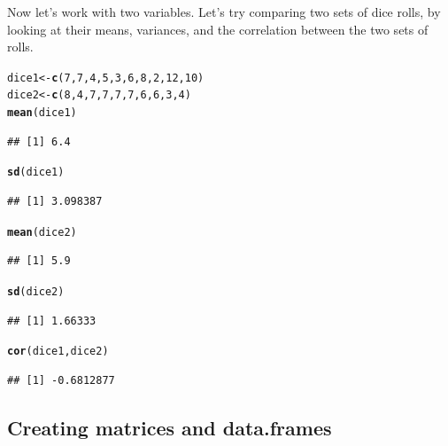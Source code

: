 \documentclass[12pt]{article}\usepackage[]{graphicx}\usepackage[]{color}
\makeatletter
\newcommand{\hlnum}[1]{\textcolor[rgb]{0.686,0.059,0.569}{#1}}%
\newcommand{\hlstd}[1]{\textcolor[rgb]{0.345,0.345,0.345}{#1}}%
\newcommand{\hlkwb}[1]{\textcolor[rgb]{0.69,0.353,0.396}{#1}}%
\newcommand{\hlkwd}[1]{\textcolor[rgb]{0.737,0.353,0.396}{\textbf{#1}}}%
\newenvironment{kframe}{%
 \def\at@end@of@kframe{}%
 \ifinner\ifhmode%
  \def\at@end@of@kframe{\end{minipage}}%
  \begin{minipage}{\columnwidth}%
 \fi\fi%
 \def\FrameCommand##1{\hskip\@totalleftmargin \hskip-\fboxsep
 \colorbox{shadecolor}{##1}\hskip-\fboxsep
     \hskip-\linewidth \hskip-\@totalleftmargin \hskip\columnwidth}%
 \MakeFramed {\advance\hsize-\width
   \@totalleftmargin\z@ \linewidth\hsize
   \@setminipage}}%
 {\par\unskip\endMakeFramed%
 \at@end@of@kframe}
\newenvironment{knitrout}{}{} %
\makeatother
\begin{document}
Now let's work with two variables. Let's try comparing two sets of dice rolls, by looking at their means, variances, and the correlation between the two sets of rolls.
\begin{knitrout}
\color{fgcolor}\begin{kframe}
\begin{alltt}
\hlstd{dice1} \hlkwb{<-} \hlkwd{c}\hlstd{(}\hlnum{7}\hlstd{,}\hlnum{7}\hlstd{,}\hlnum{4}\hlstd{,}\hlnum{5}\hlstd{,}\hlnum{3}\hlstd{,}\hlnum{6}\hlstd{,}\hlnum{8}\hlstd{,}\hlnum{2}\hlstd{,}\hlnum{12}\hlstd{,}\hlnum{10}\hlstd{)}
\hlstd{dice2} \hlkwb{<-} \hlkwd{c}\hlstd{(}\hlnum{8}\hlstd{,}\hlnum{4}\hlstd{,}\hlnum{7}\hlstd{,}\hlnum{7}\hlstd{,}\hlnum{7}\hlstd{,}\hlnum{7}\hlstd{,}\hlnum{6}\hlstd{,}\hlnum{6}\hlstd{,}\hlnum{3}\hlstd{,}\hlnum{4}\hlstd{)}
\hlkwd{mean}\hlstd{(dice1)}
\end{alltt}
\begin{verbatim}
## [1] 6.4
\end{verbatim}
\begin{alltt}
\hlkwd{sd}\hlstd{(dice1)}
\end{alltt}
\begin{verbatim}
## [1] 3.098387
\end{verbatim}
\begin{alltt}
\hlkwd{mean}\hlstd{(dice2)}
\end{alltt}
\begin{verbatim}
## [1] 5.9
\end{verbatim}
\begin{alltt}
\hlkwd{sd}\hlstd{(dice2)}
\end{alltt}
\begin{verbatim}
## [1] 1.66333
\end{verbatim}
\begin{alltt}
\hlkwd{cor}\hlstd{(dice1,dice2)}
\end{alltt}
\begin{verbatim}
## [1] -0.6812877
\end{verbatim}
\end{kframe}
\end{knitrout}

\subsection{Creating matrices and data.frames}
\end{document}
